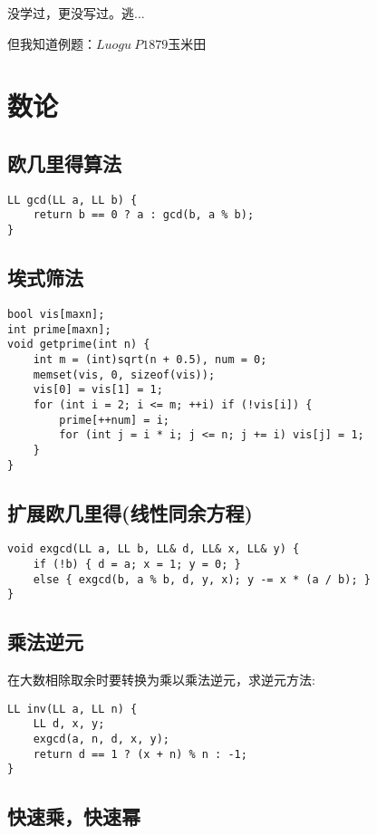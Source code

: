 \documentclass[UTF8]{ctexart}
\begin{document}
没学过，更没写过。逃...

但我知道例题：$Luogu\ P1879$玉米田

\section{数论}

\subsection{欧几里得算法}

\begin{lstlisting}
LL gcd(LL a, LL b) {
    return b == 0 ? a : gcd(b, a % b);
}
\end{lstlisting}

\subsection{埃式筛法}

\begin{lstlisting}
bool vis[maxn];
int prime[maxn];
void getprime(int n) {
    int m = (int)sqrt(n + 0.5), num = 0;
    memset(vis, 0, sizeof(vis));
    vis[0] = vis[1] = 1;
    for (int i = 2; i <= m; ++i) if (!vis[i]) {
        prime[++num] = i;
        for (int j = i * i; j <= n; j += i) vis[j] = 1;
    }
}
\end{lstlisting}

\subsection{扩展欧几里得(线性同余方程)}

\begin{lstlisting}
void exgcd(LL a, LL b, LL& d, LL& x, LL& y) {
    if (!b) { d = a; x = 1; y = 0; }
    else { exgcd(b, a % b, d, y, x); y -= x * (a / b); }
}
\end{lstlisting}

\subsection{乘法逆元}

在大数相除取余时要转换为乘以乘法逆元，求逆元方法:

\begin{lstlisting}
LL inv(LL a, LL n) {
    LL d, x, y;
    exgcd(a, n, d, x, y);
    return d == 1 ? (x + n) % n : -1;
}
\end{lstlisting}

\subsection{快速乘，快速幂}
\end{document}

